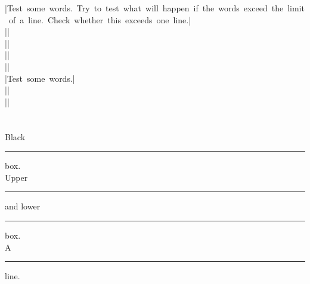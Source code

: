 \documentclass{article}
\begin{document}
|\mbox{Test some words. Try to test what will happen if the words exceed the limit of a line. Check whether this exceeds one line.}|\\
||\\
||\\
||\\
|| \\[3ex]


|\mbox{Test some words.}| \\
|| \\
|| \\[4ex]

\\[1ex]
\setlength{\fboxrule}{1.6pt}
\setlength{\fboxsep}{1em}
 \\[3ex]


Black \rule{12pt}{4pt} box. \\
Upper \rule[4pt]{6pt}{8pt} and
lower \rule[-4pt]{6pt}{8pt} box. \\
A \rule[-.4pt]{3em}{.4pt} line.
\end{document}

